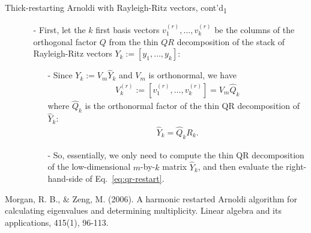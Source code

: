 \documentclass[t,usepdftitle=false]{beamer}
\begin{document}
\begin{frame}{Thick-restarting Arnoldi with Rayleigh-Ritz vectors, cont'd\textsubscript{1}}
\begin{itemize}
\item[]
\begin{itemize}\normalsize
\item[-] First, let the $k$ first basis vectors $v_1^{(r)},\dots,v_k^{(r)}$ be the columns of the orthogonal factor $Q$ from the thin $QR$ decomposition of the stack of Rayleigh-Ritz vectors $Y_k:=[y_1,\dots,y_k]$:
\begin{itemize}\normalsize
\item[-] Since $Y_k:=V_m\hat{Y}_k$ and $V_m$ is orthonormal, we have
\begin{align}\label{eq:qr-restart}
V_k^{(r)}:=[v_1^{(r)},\dots,v_k^{(r)}]=V_m\hat{Q}_k
\end{align}
where $\hat{Q}_k$ is the orthonormal factor of the thin QR decomposition of $\hat{Y}_k$:
\begin{align*}
\hat{Y}_k=\hat{Q}_kR_k.
\end{align*}
\item[-] So, essentially, we only need to compute the thin QR decomposition of the low-dimensional $m$-by-$k$ matrix $\hat{Y}_k$, and then evaluate the right-hand-side of Eq.~\eqref{eq:qr-restart}.
\end{itemize}
\end{itemize}
\end{itemize}\smallskip
\tiny{Morgan, R. B., \& Zeng, M. (2006). A harmonic restarted Arnoldi algorithm for calculating eigenvalues and determining
multiplicity. Linear algebra and its applications, 415(1), 96-113.}
\end{frame}
\end{document}
